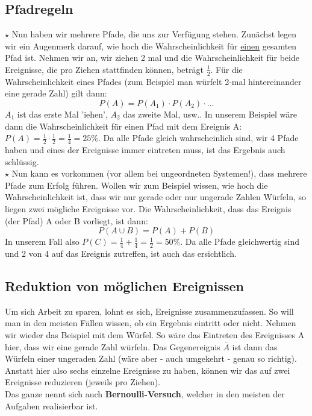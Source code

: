 	\subsection{Pfadregeln}
		\(\star\) Nun haben wir mehrere Pfade, die uns zur Verfügung stehen. Zunächst
		legen wir ein Augenmerk darauf, wie hoch die Wahrscheinlichkeit für
		\underline{einen} gesamten Pfad ist. Nehmen wir an, wir ziehen 2 mal und die
		Wahrscheinlichkeit für beide Ereignisse, die pro Ziehen stattfinden können,
		beträgt \(\frac{1}{2}\). Für die Wahrscheinlichkeit eines Pfades (zum Beispiel
		man würfelt 2-mal hintereinander eine gerade Zahl) gilt dann:
		\[P(A)=P(A_1) \cdot P(A_2) \cdot \ldots\]
		\(A_1\) ist das erste Mal 'iehen', \(A_2\) das zweite Mal, usw.. In unserem
		Beispiel wäre dann die Wahrscheinlichkeit für einen Pfad mit dem Ereignis A:
		\(P(A)=\frac{1}{2} \cdot \frac{1}{2}=\frac{1}{4}=25\%\). Da alle Pfade gleich
		wahrscheinlich sind, wir 4 Pfade haben und eines der Ereignisse immer
		eintreten muss, ist das Ergebnis auch schlüssig.\\
		\(\star\) Nun kann es vorkommen (vor allem bei ungeordneten Systemen!), dass
		mehrere Pfade zum Erfolg führen. Wollen wir zum Beispiel wissen, wie hoch die
		Wahrscheinlichkeit ist, dass wir nur gerade oder nur ungerade Zahlen Würfeln,
		so liegen zwei mögliche Ereignisse vor. Die Wahrscheinlichkeit, dass das
		Ereignis (der Pfad) A oder B vorliegt, ist dann:
		\[P(A\cup B)=P(A)+P(B)\]
		In unserem Fall also \(P(C)=\frac{1}{4}+\frac{1}{4}=\frac{1}{2}=50\%\). Da
		alle Pfade gleichwertig sind und 2 von 4 auf das Ereignis zutreffen, ist auch
		das ersichtlich.

	\subsection{Reduktion von möglichen Ereignissen}
		Um sich Arbeit zu sparen, lohnt es sich, Ereignisse zusammenzufassen. So will
		man in den meisten Fällen wissen, ob ein Ergebnis eintritt oder nicht.
		Nehmen wir wieder das Beispiel mit dem Würfel. So wäre das Eintreten des
		Ereignisses A hier, dass wir eine gerade Zahl würfeln. Das Gegenereignis
		\(\overline{A}\) ist dann das Würfeln einer ungeraden Zahl (wäre aber - auch
		umgekehrt - genau so richtig). Anstatt hier also sechs einzelne Ereignisse zu
		haben, können wir das auf zwei Ereignisse reduzieren (jeweils pro Ziehen).\\
		Das ganze nennt sich auch \textbf{Bernoulli-Versuch}, welcher in den meisten
		der Aufgaben realisierbar ist.
